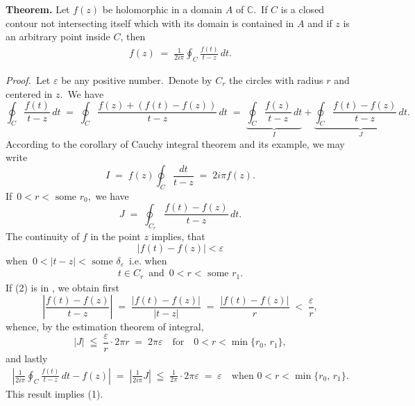 \documentclass[12pt]{article}
\theoremstyle{definition}
\begin{document}
\textbf{Theorem.}\; Let $f(z)$ be holomorphic in a domain $A$ of $\mathbb{C}$.\, If $C$ is a closed contour not intersecting itself which with its  domain is contained in $A$ and if $z$ is an arbitrary point inside $C$, then
\begin{align}
f(z) \;=\; \frac{1}{2i\pi}\oint_C\frac{f(t)}{t\!-\!z}\,dt.
\end{align}


\emph{Proof.}\, Let $\varepsilon$ be any positive number.\, Denote by $C_r$ the circles with radius $r$ and centered in $z$.\, We have
$$\oint_C\frac{f(t)}{t\!-\!z}\,dt \;=\; \oint_C\frac{f(z)\!+\!(f(t)\!-\!f(z))}{t\!-\!z}\,dt
\;=\; \underbrace{\oint_C\frac{f(z)}{t\!-\!z}\,dt}_I+\underbrace{\oint_C\frac{f(t)\!-\!f(z)}{t\!-\!z}\,dt}_J.$$
According to the corollary of Cauchy integral theorem and its example, we may write
$$I \;=\; f(z)\oint_C\frac{dt}{t\!-\!z} \;=\; 2i\pi f(z).$$
If\, $0 < r < \mbox{ some } r_0$,\, we have
$$J \;=\; \oint_{C_r}\frac{f(t)\!-\!f(z)}{t\!-\!z}\,dt.$$
The continuity of $f$ in the point $z$ implies, that
$$|f(t)\!-\!f(z)| < \varepsilon$$
when\, $0 < |t\!-\!z| < \mbox{ some } \delta_\varepsilon$\, i.e. when
\begin{align} 
t \in C_r\, \mbox{ and }\, 0 < r < \mbox{ some } r_1.
\end{align}
If (2) is in , we obtain first
$$\left|\frac{f(t)\!-\!f(z)}{t\!-\!z}\right| \;=\; \frac{|f(t)\!-\!f(z)|}{|t\!-\!z|} 
\;=\; \frac{|f(t)\!-\!f(z)|}{r} \;<\; \frac{\varepsilon}{r},$$
whence, by the estimation theorem of integral,
$$|J| \;\leqq\; \frac{\varepsilon}{r}\cdot2\pi r \;=\; 2\pi\varepsilon \quad 
\mbox{for} \quad 0 < r < \min\{r_0,\,r_1\},$$
and lastly
\begin{align}
\left|\frac{1}{2i\pi}\oint_C\frac{f(t)}{t\!-\!z}\,dt-f(z)\right| \;=\; \left|\frac{1}{2i\pi}J\right| \;\leqq\; \frac{1}{2\pi}\cdot2\pi\varepsilon \;=\; \varepsilon \quad \mbox{when  } 0 < r < \min\{r_0,\,r_1\}.
\end{align}
This result implies (1).


\end{document}
